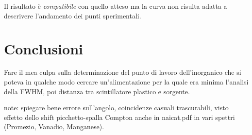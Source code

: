 \documentclass[8pt]{extarticle}
\begin{document}
Il risultato è \textit{compatibile} con quello atteso ma la curva non risulta adatta a descrivere l'andamento dei punti sperimentali. 


\section{Conclusioni}
Fare il mea culpa sulla determinazione del punto di lavoro dell'inorganico che si poteva in qualche modo cercare un'alimentazione per la quale era minima l'analisi della FWHM, poi distanza tra scintillatore plastico e sorgente.

note:
spiegare bene errore sull'angolo, coincidenze casuali trascurabili, visto effetto dello shift picchetto-spalla Compton anche in naicat.pdf in vari spettri (Promezio, Vanadio, Manganese).


\end{document}
